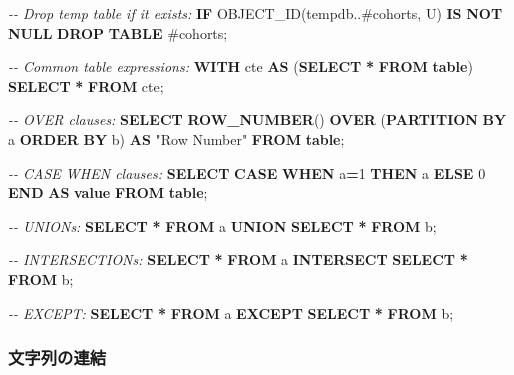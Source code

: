 \documentclass[
  11pt]{book}
\newenvironment{Shaded}{\begin{snugshade}}{\end{snugshade}}
\newcommand{\CommentTok}[1]{\textcolor[rgb]{0.56,0.35,0.01}{\textit{#1}}}
\newcommand{\ControlFlowTok}[1]{\textcolor[rgb]{0.13,0.29,0.53}{\textbf{#1}}}
\newcommand{\DecValTok}[1]{\textcolor[rgb]{0.00,0.00,0.81}{#1}}
\newcommand{\FunctionTok}[1]{\textcolor[rgb]{0.13,0.29,0.53}{\textbf{#1}}}
\newcommand{\KeywordTok}[1]{\textcolor[rgb]{0.13,0.29,0.53}{\textbf{#1}}}
\newcommand{\NormalTok}[1]{#1}
\newcommand{\OperatorTok}[1]{\textcolor[rgb]{0.81,0.36,0.00}{\textbf{#1}}}
\newcommand{\OtherTok}[1]{\textcolor[rgb]{0.56,0.35,0.01}{#1}}
\newcommand{\StringTok}[1]{\textcolor[rgb]{0.31,0.60,0.02}{#1}}
\theoremstyle{definition}
\theoremstyle{definition}
\theoremstyle{definition}
\theoremstyle{definition}
\theoremstyle{remark}
\begin{document}
\begin{Shaded}
\begin{Highlighting}[]
\CommentTok{{-}{-} Drop temp table if it exists:}
\ControlFlowTok{IF}\NormalTok{ OBJECT\_ID(}\StringTok{\textquotesingle{}tempdb..\#cohorts\textquotesingle{}}\NormalTok{, }\StringTok{\textquotesingle{}U\textquotesingle{}}\NormalTok{) }\KeywordTok{IS} \KeywordTok{NOT} \KeywordTok{NULL}
  \KeywordTok{DROP} \KeywordTok{TABLE}\NormalTok{ \#cohorts;}

\CommentTok{{-}{-} Common table expressions:}
\KeywordTok{WITH}\NormalTok{ cte }\KeywordTok{AS}\NormalTok{ (}\KeywordTok{SELECT} \OperatorTok{*} \KeywordTok{FROM} \KeywordTok{table}\NormalTok{) }\KeywordTok{SELECT} \OperatorTok{*} \KeywordTok{FROM}\NormalTok{ cte;}

\CommentTok{{-}{-} OVER clauses:}
\KeywordTok{SELECT} \FunctionTok{ROW\_NUMBER}\NormalTok{() }\KeywordTok{OVER}\NormalTok{ (}\KeywordTok{PARTITION} \KeywordTok{BY}\NormalTok{ a }\KeywordTok{ORDER} \KeywordTok{BY}\NormalTok{ b)}
  \KeywordTok{AS} \OtherTok{"Row Number"} \KeywordTok{FROM} \KeywordTok{table}\NormalTok{;}

\CommentTok{{-}{-} CASE WHEN clauses:}
\KeywordTok{SELECT} \ControlFlowTok{CASE} \ControlFlowTok{WHEN}\NormalTok{ a}\OperatorTok{=}\DecValTok{1} \ControlFlowTok{THEN}\NormalTok{ a }\ControlFlowTok{ELSE} \DecValTok{0} \ControlFlowTok{END} \KeywordTok{AS} \FunctionTok{value} \KeywordTok{FROM} \KeywordTok{table}\NormalTok{;}

\CommentTok{{-}{-} UNIONs:}
\KeywordTok{SELECT} \OperatorTok{*} \KeywordTok{FROM}\NormalTok{ a }\KeywordTok{UNION} \KeywordTok{SELECT} \OperatorTok{*} \KeywordTok{FROM}\NormalTok{ b;}

\CommentTok{{-}{-} INTERSECTIONs:}
\KeywordTok{SELECT} \OperatorTok{*} \KeywordTok{FROM}\NormalTok{ a }\KeywordTok{INTERSECT} \KeywordTok{SELECT} \OperatorTok{*} \KeywordTok{FROM}\NormalTok{ b;}

\CommentTok{{-}{-} EXCEPT:}
\KeywordTok{SELECT} \OperatorTok{*} \KeywordTok{FROM}\NormalTok{ a }\KeywordTok{EXCEPT} \KeywordTok{SELECT} \OperatorTok{*} \KeywordTok{FROM}\NormalTok{ b;}
\end{Highlighting}
\end{Shaded}

\subsubsection*{文字列の連結}\label{ux6587ux5b57ux5217ux306eux9023ux7d50}
\end{document}
